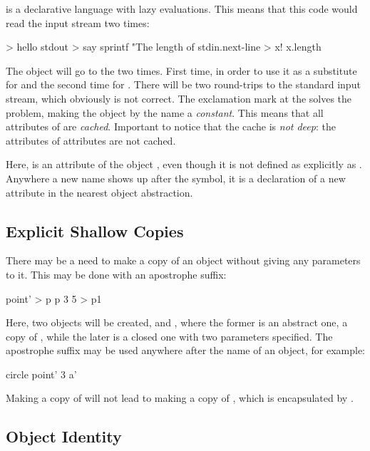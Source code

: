 \eolang{} is a declarative language with lazy evaluations. This means
that this code would read the input stream two times:

\begin{ffcode}
[] > hello
  stdout > say
    sprintf
      "The length of %
      stdin.next-line > x!
      x.length
\end{ffcode}

The  object will go to the  two times. First time,
in order to use it as a substitute for  and the second time for
. There will be two round-trips to the standard input stream, which
obviously is not correct. The exclamation mark at the  solves the
problem, making the object by the name  a \emph{constant}. This means
that all attributes of  are \emph{cached}. Important to notice
that the cache is \emph{not deep}: the attributes of attributes are not cached.

Here,  is an attribute of the object , even though
it is not defined as explicitly as . Anywhere a new
name shows up after the \ff{>} symbol, it is a declaration of a new
attribute in the nearest object abstraction.

\subsection{Explicit Shallow Copies}

There may be a need to make a copy of an object without giving any
parameters to it. This may be done with an apostrophe suffix:

\begin{ffcode}
point' > p
p 3 5 > p1
\end{ffcode}

Here, two objects will be created,  and , where
the former is an abstract one, a copy of , while the
later is a closed one with two parameters specified. The
apostrophe suffix may be used anywhere after the name of an object,
for example:

\begin{ffcode}
circle
  point' 3 a'
\end{ffcode}

Making a copy of  will not lead to making a copy of ,
which is encapsulated by .

\subsection{Object Identity}

